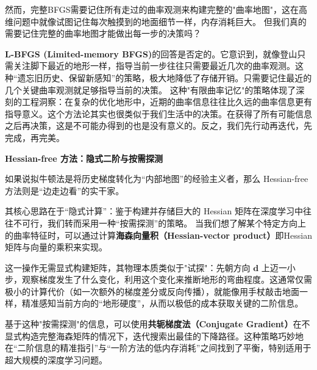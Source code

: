 然而，完整BFGS需要记住所有走过的曲率观测来构建完整的"曲率地图"，这在高维问题中就像试图记住每次触摸到的地面细节一样，内存消耗巨大。
但我们真的需要记住完整的曲率地图才能做出每一步的决策吗？

\textbf{L-BFGS (Limited-memory BFGS)}的回答是否定的。它意识到，就像登山只需关注脚下最近的地形一样，指导当前一步往往只需要最近几次的曲率观测。这种“遗忘旧历史、保留新感知”的策略，极大地降低了存储开销。只需要记住最近的几个关键曲率观测就足够指导当前的决策。
这种"有限曲率记忆"的策略体现了深刻的工程洞察：在复杂的优化地形中，近期的曲率信息往往比久远的曲率信息更有指导意义。这个方法论其实也很类似于我们生活中的决策。在获得了所有可能信息之后再决策，这是不可能办得到的也是没有意义的。反之，我们先行动再迭代，先完成，再完美。

\textbf{Hessian-free 方法：隐式二阶与按需探测}

如果说拟牛顿法是将历史梯度转化为“内部地图”的经验主义者，那么 Hessian-free 方法则是“边走边看”的实干家。

其核心思路在于“隐式计算”：鉴于构建并存储巨大的 Hessian 矩阵在深度学习中往往不可行，我们转而采用一种“按需探测”的策略。 当我们想了解某个特定方向上的曲率特征时，可以通过计算\textbf{海森向量积（Hessian-vector product）}即Hessian矩阵与向量的乘积来实现。

这一操作无需显式构建矩阵，其物理本质类似于"试探"：先朝方向 $\mathbf{d}$ 上迈一小步，观察梯度发生了什么变化，利用这个变化来推断地形的弯曲程度。这通常仅需极小的计算代价（如一次额外的梯度差分或反向传播），就能像用手杖敲击地面一样，精准感知当前方向的“地形硬度”，从而以极低的成本获取关键的二阶信息。

基于这种"按需探测"的信息，可以使用\textbf{共轭梯度法（Conjugate Gradient）}在不显式构造完整海森矩阵的情况下，迭代搜索出最佳的下降路径。这种策略巧妙地在“二阶信息的精准指引”与“一阶方法的低内存消耗”之间找到了平衡，特别适用于超大规模的深度学习问题。


%
%
%
%

